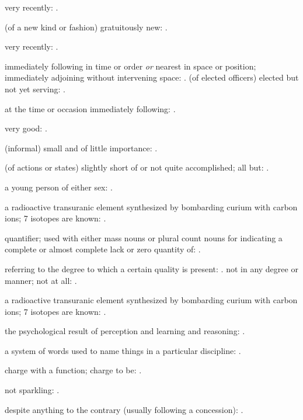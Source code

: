   very recently: .

  (of a new kind or fashion) gratuitously new: .

  very recently: .

  immediately following in time or order \textit{or} nearest in space or position; immediately adjoining without intervening space: . (of elected officers) elected but not yet serving: .

  at the time or occasion immediately following: .

  very good: .

  (informal) small and of little importance: .

  (of actions or states) slightly short of or not quite accomplished; all but: .

  a young person of either sex: .

  a radioactive transuranic element synthesized by bombarding curium with carbon ions; 7 isotopes are known: .

  quantifier; used with either mass nouns or plural count nouns for indicating a complete or almost complete lack or zero quantity of: .

  referring to the degree to which a certain quality is present: . not in any degree or manner; not at all: .

  a radioactive transuranic element synthesized by bombarding curium with carbon ions; 7 isotopes are known: .

  the psychological result of perception and learning and reasoning: .

  a system of words used to name things in a particular discipline: .

  charge with a function; charge to be: .

  not sparkling: .

  despite anything to the contrary (usually following a concession): .

